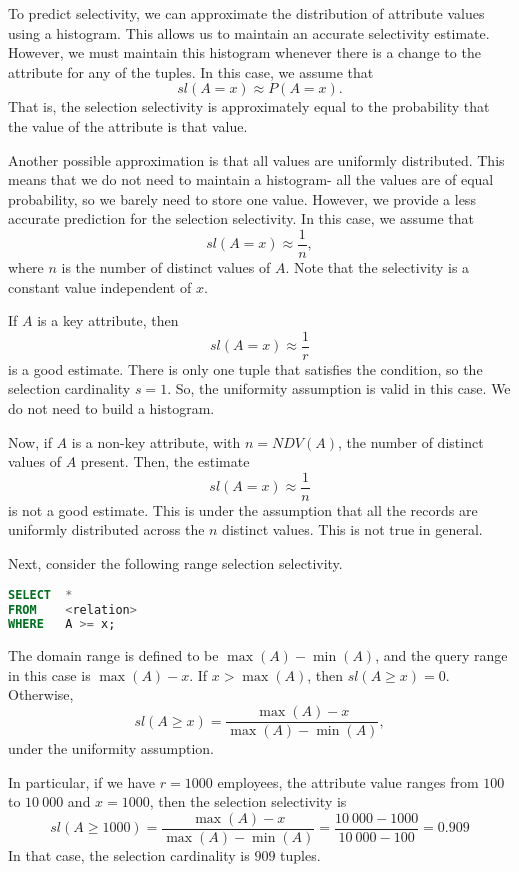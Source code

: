 \documentclass[a4paper, openany]{memoir}
\theoremstyle{definition}
\theoremstyle{plain}
\begin{document}
To predict selectivity, we can approximate the distribution of attribute values using a histogram. This allows us to maintain an accurate selectivity estimate. However, we must maintain this histogram whenever there is a change to the attribute for any of the tuples. In this case, we assume that
\[\textit{sl}(A = x) \approx P(A = x).\]
That is, the selection selectivity is approximately equal to the probability that the value of the attribute is that value.

Another possible approximation is that all values are uniformly distributed. This means that we do not need to maintain a histogram- all the values are of equal probability, so we barely need to store one value. However, we provide a less accurate prediction for the selection selectivity. In this case, we assume that
\[\textit{sl}(A = x) \approx \frac{1}{n},\]
where $n$ is the number of distinct values of $A$. Note that the selectivity is a constant value independent of $x$. 

If $A$ is a key attribute, then
\[\textit{sl}(A = x) \approx \frac{1}{r}\]
is a good estimate. There is only one tuple that satisfies the condition, so the selection cardinality $s = 1$. So, the uniformity assumption is valid in this case. We do not need to build a histogram.

Now, if $A$ is a non-key attribute, with $n = NDV(A)$, the number of distinct values of $A$ present. Then, the estimate
\[\textit{sl}(A = x) \approx \frac{1}{n}\]
is not a good estimate. This is under the assumption that all the records are uniformly distributed across the $n$ distinct values. This is not true in general.

Next, consider the following range selection selectivity.
\begin{lstlisting}[language=SQL]
SELECT  *
FROM    <relation>
WHERE   A >= x;
\end{lstlisting}
The domain range is defined to be $\max (A) - \min (A)$, and the query range in this case is $\max(A) - x$. If $x > \max(A)$, then $\textit{sl}(A \geq x) = 0$. Otherwise,
\[\textit{sl}(A \geq x) = \frac{\max(A) - x}{\max(A) - \min(A)},\]
under the uniformity assumption.

In particular, if we have $r = 1000$ employees, the attribute value ranges from $100$ to $10 \ 000$ and $x = 1000$, then the selection selectivity is
\[\textit{sl}(A \geq 1000) = \frac{\max(A) - x}{\max(A) - \min(A)} = \frac{10 \ 000 - 1000}{10 \ 000 - 100} = 0.909\]
In that case, the selection cardinality is $909$ tuples.
\end{document}
